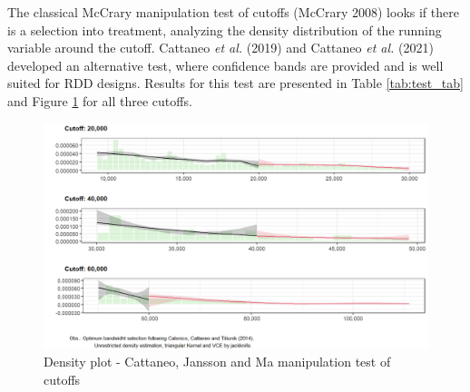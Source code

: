 \documentclass[
  12pt,
]{article}
\begin{document}
The classical McCrary manipulation test of cutoffs (McCrary 2008) looks
if there is a selection into treatment, analyzing the density
distribution of the running variable around the cutoff. Cattaneo
\emph{et al.} (2019) and Cattaneo \emph{et al.} (2021) developed an
alternative test, where confidence bands are provided and is well suited
for RDD designs. Results for this test are presented in Table
\ref{tab:test_tab} and Figure \ref{fig:test_plot} for all three cutoffs.

\begin{table}[!h]

\caption{\label{tab:test_tab}Cattaneo, Jansson and Ma manipulation test of cutoffs}
\centering
{}
\end{table}

\begin{figure}
\centering
\includegraphics{artigo1_files/figure-latex/test_plot-1.png}
\caption{Density plot - Cattaneo, Jansson and Ma manipulation test of
cutoffs \label{fig:test_plot}}
\end{figure}
\end{document}
